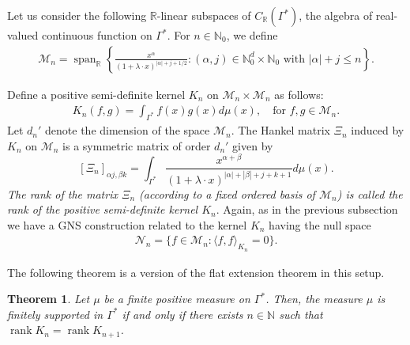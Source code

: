 \documentclass[11pt,reqno]{amsart}
\theoremstyle{plain}
\newtheorem{theorem}{Theorem}[section]
\theoremstyle{definition}
\numberwithin{equation}{section}
\newcommand{\N}{\mathbb{N}}
\newcommand{\R}{\mathbb{R}}
\newcommand{\ltt}{\left(}
\newcommand{\rtt}{\right)}
\newcommand{\rnk} {\operatorname{rank}}
\begin{document}
	Let us consider the following $\mathbb{R}$-linear subspaces of $C_\mathbb{R}(\Gamma^*)$, the algebra of real-valued continuous function on $\Gamma^*$. For $n\in \N_0$, we define
	\begin{align*}
		\mathcal M_n=
		\operatorname{span}_\R\left\{\frac{x^\alpha}{\ltt 1+\lambda\cdot x\rtt^{|\alpha|+j+1/2}}: (\alpha, j)\in \mathbb{N}_0^d \times \mathbb{N}_0 \text{ with } |\alpha|+j\leq n\right\}.
	\end{align*}
	
	
	Define a positive semi-definite kernel $K_n$ on $\mathcal{M}_n \times \mathcal{M}_n$ as follows:
	\begin{align*}
		K_n(f, g) = \int_{\Gamma^*} f(x) g(x) d\mu(x),\quad \text{for } f, g\in \mathcal M_{n}.
	\end{align*}
	Let $d_n'$ denote the dimension of the space $\mathcal M_n$. The Hankel matrix $\Xi_{n}$ induced by $K_n$ on $\mathcal M_n$ is a symmetric matrix of order $d_n'$
	given by 
	\[
	\left[\Xi_{n}\right]_{\alpha j, \beta k}=\int_{\Gamma^*} \frac{x^{\alpha+\beta}}{\ltt 1+\lambda\cdot x\rtt^{|\alpha|+|\beta|+j+k+1}}d\mu(x).
	\]
	{\em The rank of the matrix $\Xi_n$ (according to a fixed ordered basis of $\mathcal{M}_n$) is called  the rank of the positive semi-definite kernel $K_n$}. Again, as in the previous subsection we have a GNS construction related to the kernel $K_n$ having the null space 
	\begin{align*}
		\mathcal{N}_n = \{f \in \mathcal{M}_n : \langle f, f\rangle_{K_n} = 0 \}.
	\end{align*}
	

    The following theorem is a version of the flat extension theorem in this setup.
	\begin{theorem}\label{th:flat}
		Let $\mu$ be a finite positive measure on $\Gamma^*$. Then, the measure $\mu$ is finitely supported in $\Gamma^*$ if and only if there exists $n\in\N$ such that $\operatorname{rank} K_n=\rnk K_{n+1}$.
	\end{theorem}
	
	
	
	
	
\end{document}
